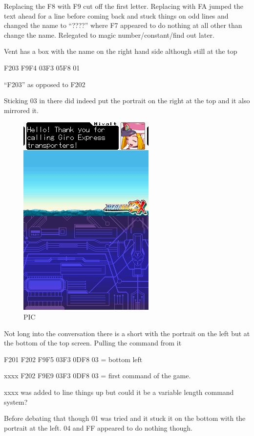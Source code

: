 \documentclass[
]{book}
\begin{document}
Replacing the F8 with F9 cut off the first letter. Replacing with FA jumped the text ahead for a line before coming back and stuck things on odd lines and changed the name to ``????'' where F7 appeared to do nothing at all other than change the name. Relegated to magic number/constant/find out later.

Vent has a box with the name on the right hand side although still at the top

F203 F9F4 03F3 05F8 01

``F203'' as opposed to F202

Sticking 03 in there did indeed put the portrait on the right at the top and it also mirrored it.

\begin{figure}
\centering
\includegraphics{images/109_home_fast6191_romhackingguide_unrenamed_fil___iginal_borders_romhackingguidemarkupexedit4.png}
\caption{PIC}
\end{figure}

Not long into the conversation there is a short with the portrait on the left but at the bottom of the top screen. Pulling the command from it

F201 F202 F9F5 03F3 0DF8 03 = bottom left

xxxx F202 F9E9 03F3 0DF8 03 = first command of the game.

xxxx was added to line things up but could it be a variable length command system?

Before debating that though 01 was tried and it stuck it on the bottom with the portrait at the left. 04 and FF appeared to do nothing though.
\end{document}
